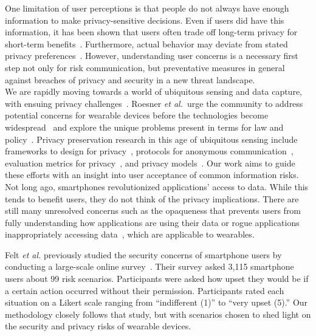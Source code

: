 \documentclass[conference]{IEEEtran}
\begin{document}
One limitation of user perceptions is that people do not always have enough information to make privacy-sensitive decisions. Even if users did have this information, it has been shown that users often trade off long-term privacy for short-term benefits~\cite{acquisti2005privacy}. Furthermore, actual behavior may deviate from stated privacy preferences~\cite{spiekermann2001privacy}. However, understanding user concerns is a necessary first step not only for risk communication, but preventative measures in general against breaches of privacy and security in a new threat landscape. \\

 We are rapidly moving towards a world of ubiquitous sensing and data capture, with ensuing privacy challenges~\cite{abowd2000charting,palen2003unpacking,camp2000internet}. Roesner {\it et al.}\ urge the community to address potential concerns for wearable devices before the technologies become widespread~\cite{roesner2014security} and explore the unique problems present in terms for law and policy~\cite{roesner2014augmented}. Privacy preservation research in this age of ubiquitous sensing include frameworks to design for privacy~\cite{bellotti1993design,camp2003designing,langheinrich2001privacy}, protocols for anonymous communication~\cite{cornelius2008anonysense}, evaluation metrics for privacy~\cite{scholtz2004toward}, and privacy models~\cite{hong2004privacy, jiang2002approximate}. Our work aims to guide these efforts with an insight into user acceptance of common information risks. \\

 Not long ago, smartphones revolutionized applications' access to  data. While this tends to benefit users, they do not think of the privacy implications. There are still many unresolved concerns such as the opaqueness that prevents users from fully understanding how applications are using their data or rogue applications inappropriately accessing data~\cite{1_kane_2010, zhou2011taming}, which are applicable to wearables.

Felt {\it et al.} previously studied the security concerns of smartphone users by conducting a large-scale online survey~\cite{Felt}. Their survey asked 3,115 smartphone users about 99 risk scenarios. Participants were asked how upset they would be if a certain action occurred without their permission. Participants rated each situation on a Likert scale ranging from ``indifferent (1)'' to ``very upset (5).'' Our methodology closely follows that study, but with scenarios chosen to shed light on the security and privacy risks of wearable devices.\\
\end{document}
